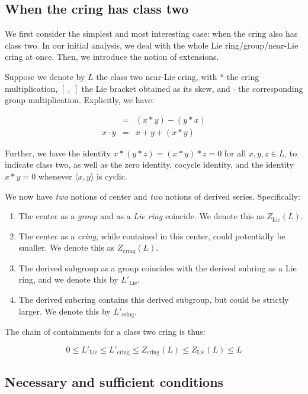 \documentclass[10pt]{amsart}
\begin{document}
\subsection{When the cring has class two}

We first consider the simplest and most interesting case: when the
cring also has class two. In our initial analysis, we deal with the
whole Lie ring/group/near-Lie cring at once. Then, we introduce the
notion of extensions.

Suppose we denote by $L$ the class two near-Lie cring, with $*$ the
cring multiplication, $[ \ , \ ]$ the Lie bracket obtained as its
skew, and $ \cdot$ the corresponding group multiplication. Explicitly,
we have:

\begin{eqnarray*}
  [x,y] & = & (x * y) - (y * x)\\
  x \cdot y & = & x + y + (x * y)
\end{eqnarray*}

Further, we have the identity $x * (y * z) = (x * y) * z = 0$ for all
$x,y,z \in L$, to indicate class two, as well as the zero identity,
cocycle identity, and the identity $x * y = 0$ whenever $\langle x,y
\rangle$ is cyclic.

We now have {\em two} notions of center and {\em two} notions of
derived series. Specifically:

\begin{enumerate}
\item The center as a {\em group} and as a {\em Lie ring} coincide. We
  denote this as $Z_{\text{Lie}}(L)$.
\item The center as a {\em cring}, while contained in this center,
  could potentially be smaller. We denote this as
  $Z_{\text{cring}}(L)$.
\item The derived subgroup as a group coincides with the derived
  subring as a Lie ring, and we denote this by $L'_{\text{Lie}}$.
\item The derived subcring contains this derived subgroup, but could
  be strictly larger. We denote this by $L'_{\text{cring}}$.
\end{enumerate}

The chain of containments for a class two cring is thus:

$$0 \le L'_{\text{Lie}} \le L'_{\text{cring}} \le Z_{\text{cring}}(L) \le Z_{\text{Lie}}(L) \le L$$

\subsection{Necessary and sufficient conditions}
\end{document}
